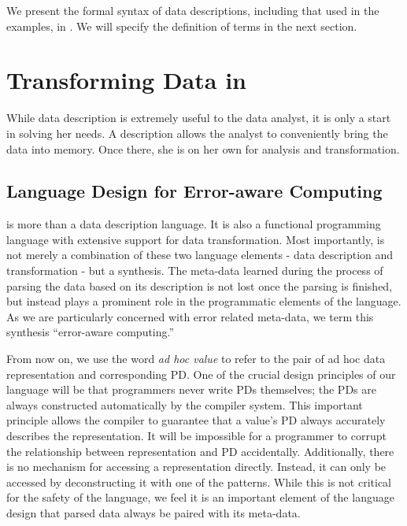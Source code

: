 \documentclass{entcs}
\begin{document}
We present the formal syntax of data descriptions, including that used
in the examples, in . We will specify the
definition of terms  in the next section.

\section{Transforming Data in \datatype{}}
\label{sec:data-transformation}

While data description is extremely useful to the data analyst, it is
only a start in solving her needs. A description allows the analyst to
conveniently bring the data into memory. Once there, she is on her own
for analysis and transformation.

\subsection{Language Design for Error-aware Computing}

\datatype{} is more than a data description language. It is also a
functional programming language with extensive support for data
transformation. Most importantly, \datatype{} is not merely a combination
of these two language elements - data description and transformation -
but a synthesis.  The meta-data learned during the process of parsing
the data based on its description is not lost once the parsing is
finished, but instead plays a prominent role in the programmatic
elements of the language. As we are particularly concerned with error
related meta-data, we term this synthesis ``error-aware computing.''

From now on, we use the word {\em ad hoc value} to refer to the pair
of ad hoc data representation and corresponding PD.  One of the
crucial design principles of our language will be that programmers
never write PDs themselves; the PDs are always constructed
automatically by the compiler system. This important principle allows
the compiler to guarantee that a value's PD always accurately
describes the representation.  It will be impossible for a programmer
to corrupt the relationship between representation and PD
accidentally. Additionally, there is no mechanism for accessing a
representation directly. Instead, it can only be accessed by
deconstructing it with one of the patterns. While this is not critical
for the safety of the language, we feel it is an important element of
the language design that parsed data always be paired with its
meta-data.
\end{document}
